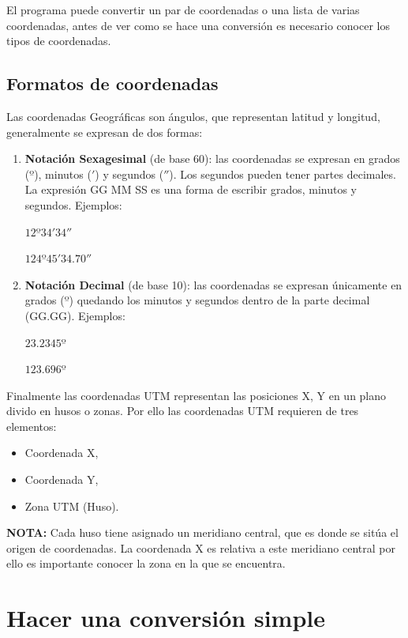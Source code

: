 \documentclass[12pt, letterpaper]{article}
\begin{document}
El programa puede convertir un par de coordenadas o una lista de varias coordenadas, antes de ver como se hace una conversión es necesario conocer los tipos de coordenadas.


\subsection{Formatos de coordenadas}


Las coordenadas Geográficas son ángulos, que representan latitud y longitud, generalmente se expresan de dos formas:

\begin{enumerate}
\item \textbf{Notación Sexagesimal} (de base 60): las coordenadas se expresan en grados ($º$), minutos ($'$) y segundos ($''$). Los segundos pueden tener partes decimales. La expresión GG MM SS es una forma de escribir grados, minutos y segundos. Ejemplos:

$12º34'34''$

$124º45'34.70''$

\item \textbf{Notación Decimal} (de base 10): las coordenadas se expresan únicamente en grados ($º$) quedando los minutos y segundos dentro de la parte decimal (GG.GG). Ejemplos:

$23.2345º$

$123.696º$

\end{enumerate}

Finalmente las coordenadas UTM representan las posiciones X, Y en un plano divido en husos o zonas. Por ello las coordenadas UTM requieren de tres elementos:

\begin{itemize}
\item Coordenada X, 
\item Coordenada Y, 
\item Zona UTM (Huso).
\end{itemize}

\textbf{NOTA:} Cada huso tiene asignado un meridiano central, que es donde se sitúa el origen de coordenadas. La coordenada X es relativa a este meridiano central por ello es importante conocer la zona en la que se encuentra.

\section{Hacer una conversión simple}
\end{document}
